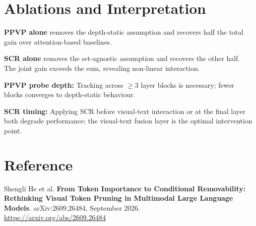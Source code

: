 \documentclass[10pt,twocolumn]{article}
\begin{document}
\section{Ablations and Interpretation}

\textbf{PPVP alone} removes the depth-static assumption and recovers half
the total gain over attention-based baselines.

\textbf{SCR alone} removes the set-agnostic assumption and recovers the
other half. The joint gain exceeds the sum, revealing non-linear interaction.

\textbf{PPVP probe depth:} Tracking across $\geq$3 layer blocks is necessary;
fewer blocks converges to depth-static behaviour.

\textbf{SCR timing:} Applying SCR before visual-text interaction or at the
final layer both degrade performance; the visual-text fusion layer is the
optimal intervention point.

\section*{Reference}

Shengli He et al.
\textbf{From Token Importance to Conditional Removability: Rethinking
Visual Token Pruning in Multimodal Large Language Models}.
arXiv:2609.26484, September 2026.\\
\url{https://arxiv.org/abs/2609.26484}
\end{document}
